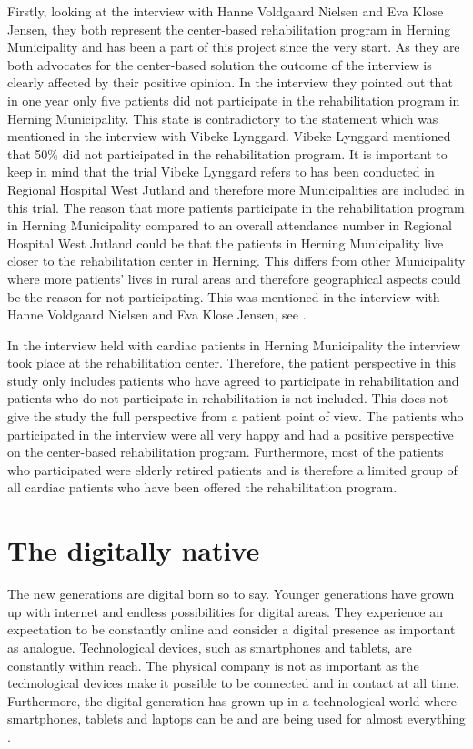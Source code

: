 Firstly, looking at the interview with Hanne Voldgaard Nielsen and Eva Klose Jensen, they both represent the center-based rehabilitation program in Herning Municipality and has been a part of this project since the very start. As they are both advocates for the center-based solution the outcome of the interview is clearly affected by their positive opinion. In the interview they pointed out that in one year only five patients did not participate in the rehabilitation program in Herning Municipality. This state is contradictory to the statement which was mentioned in the interview with Vibeke Lynggard. Vibeke Lynggard mentioned that 50\% did not participated in the rehabilitation program. It is important to keep in mind that the trial Vibeke Lynggard refers to has been conducted in Regional Hospital West Jutland and therefore more Municipalities are included in this trial. The reason that more patients participate in the rehabilitation program in Herning Municipality compared to an overall attendance number in Regional Hospital West Jutland could be that the patients in Herning Municipality live closer to the rehabilitation center in Herning. This differs from other Municipality where more patients’ lives in rural areas and therefore geographical aspects could be the reason for not participating. This was mentioned in the interview with Hanne Voldgaard Nielsen and Eva Klose Jensen, see .    

In the interview held with cardiac patients in Herning Municipality the interview took place at the rehabilitation center. Therefore, the patient perspective in this study only includes patients who have agreed to participate in rehabilitation and patients who do not participate in rehabilitation is not included. This does not give the study the full perspective from a patient point of view. The patients who participated in the interview were all very happy and had a positive perspective on the center-based rehabilitation program. Furthermore, most of the patients who participated were elderly retired patients and is therefore a limited group of all cardiac patients who have been offered the rehabilitation program. 

\section{The digitally native}

The new generations are digital born so to say. Younger generations have grown up with internet and endless possibilities for digital areas. They experience an expectation to be constantly online and consider a digital presence as important as analogue. Technological devices, such as smartphones and tablets, are constantly within reach. The physical company is not as important as the technological devices make it possible to be connected and in contact at all time. Furthermore, the digital generation has grown up in a technological world where smartphones, tablets and laptops can be and are being used for almost everything \cite{digital}.

